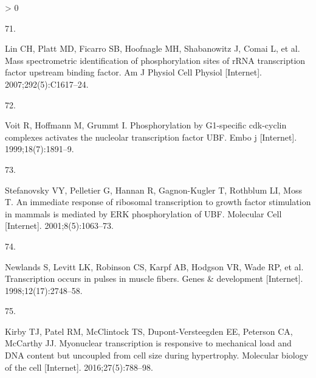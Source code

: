 \documentclass[twoside,10pt]{gihclass} %
\newlength{\cslhangindent}
\newlength{\csllabelwidth}
\newenvironment{CSLReferences}[3] %
 {%
  \setlength{\parindent}{0pt}
  \ifodd #1 \everypar{\setlength{\hangindent}{\cslhangindent}}\ignorespaces\fi
  \ifnum #2 > 0
  \setlength{\parskip}{#2\baselineskip}
  \fi
 }%
 {}
\newcommand{\CSLLeftMargin}[1]{\parbox[t]{\maxof{\widthof{#1}}{\csllabelwidth}}{#1}}
\newcommand{\CSLRightInline}[1]{\parbox[t]{\linewidth}{#1}}
\begin{document}
\begin{CSLReferences}{0}{0}
\leavevmode\hypertarget{ref-RN2563}{}%
\CSLLeftMargin{71. }
\CSLRightInline{Lin CH, Platt MD, Ficarro SB, Hoofnagle MH, Shabanowitz J, Comai L, et al. Mass spectrometric identification of phosphorylation sites of rRNA transcription factor upstream binding factor. Am J Physiol Cell Physiol {[}Internet{]}. 2007;292(5):C1617--24. }

\leavevmode\hypertarget{ref-RN2602}{}%
\CSLLeftMargin{72. }
\CSLRightInline{Voit R, Hoffmann M, Grummt I. Phosphorylation by G1-specific cdk-cyclin complexes activates the nucleolar transcription factor UBF. Embo j {[}Internet{]}. 1999;18(7):1891--9. }

\leavevmode\hypertarget{ref-RN2604}{}%
\CSLLeftMargin{73. }
\CSLRightInline{Stefanovsky VY, Pelletier G, Hannan R, Gagnon-Kugler T, Rothblum LI, Moss T. An immediate response of ribosomal transcription to growth factor stimulation in mammals is mediated by ERK phosphorylation of UBF. Molecular Cell {[}Internet{]}. 2001;8(5):1063--73. }

\leavevmode\hypertarget{ref-RN2618}{}%
\CSLLeftMargin{74. }
\CSLRightInline{Newlands S, Levitt LK, Robinson CS, Karpf AB, Hodgson VR, Wade RP, et al. Transcription occurs in pulses in muscle fibers. Genes \& development {[}Internet{]}. 1998;12(17):2748--58. }

\leavevmode\hypertarget{ref-RN2616}{}%
\CSLLeftMargin{75. }
\CSLRightInline{Kirby TJ, Patel RM, McClintock TS, Dupont-Versteegden EE, Peterson CA, McCarthy JJ. Myonuclear transcription is responsive to mechanical load and DNA content but uncoupled from cell size during hypertrophy. Molecular biology of the cell {[}Internet{]}. 2016;27(5):788--98. }

\end{CSLReferences}

\end{document}
